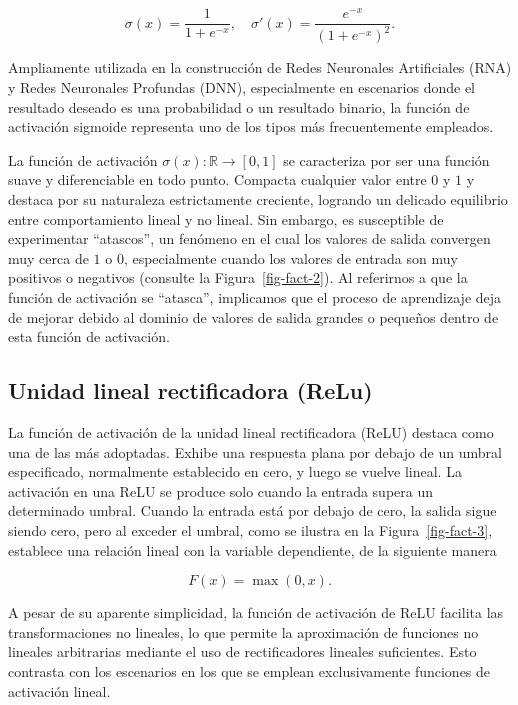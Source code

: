 \documentclass[
  us-letterpaper,
]{scrreprt}
\theoremstyle{plain}
\theoremstyle{definition}
\theoremstyle{definition}
\theoremstyle{plain}
\theoremstyle{remark}
\begin{document}
\[\sigma(x) = \frac{1}{1+e^{-x}}, \quad \sigma'(x) = \frac{e^{-x}}{(1+e^{-x})^2}.\]

Ampliamente utilizada en la construcción de Redes Neuronales
Artificiales (RNA) y Redes Neuronales Profundas (DNN), especialmente en
escenarios donde el resultado deseado es una probabilidad o un resultado
binario, la función de activación sigmoide representa uno de los tipos
más frecuentemente empleados.

La función de activación \(\sigma(x):\mathbb R\to [0,1]\) se caracteriza
por ser una función suave y diferenciable en todo punto. Compacta
cualquier valor entre \(0\) y \(1\) y destaca por su naturaleza
estrictamente creciente, logrando un delicado equilibrio entre
comportamiento lineal y no lineal. Sin embargo, es susceptible de
experimentar ``atascos'', un fenómeno en el cual los valores de salida
convergen muy cerca de \(1\) o \(0\), especialmente cuando los valores
de entrada son muy positivos o negativos (consulte la
Figura~\ref{fig-fact-2}). Al referirnos a que la función de activación
se ``atasca'', implicamos que el proceso de aprendizaje deja de mejorar
debido al dominio de valores de salida grandes o pequeños dentro de esta
función de activación.

\subsection{Unidad lineal rectificadora
(ReLu)}\label{unidad-lineal-rectificadora-relu}

La función de activación de la unidad lineal rectificadora (ReLU)
destaca como una de las más adoptadas. Exhibe una respuesta plana por
debajo de un umbral especificado, normalmente establecido en cero, y
luego se vuelve lineal. La activación en una ReLU se produce solo cuando
la entrada supera un determinado umbral. Cuando la entrada está por
debajo de cero, la salida sigue siendo cero, pero al exceder el umbral,
como se ilustra en la Figura~\ref{fig-fact-3}, establece una relación
lineal con la variable dependiente, de la siguiente manera

\[
F(x)=\max(0,x).
\]

A pesar de su aparente simplicidad, la función de activación de ReLU
facilita las transformaciones no lineales, lo que permite la
aproximación de funciones no lineales arbitrarias mediante el uso de
rectificadores lineales suficientes. Esto contrasta con los escenarios
en los que se emplean exclusivamente funciones de activación lineal.
\end{document}

